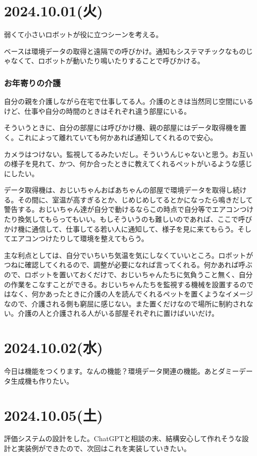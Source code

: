 \documentclass[fleqn,twocolumn]{mynote}
\begin{document}
  \section*{2024.10.01(火)}
  弱くて小さいロボットが役に立つシーンを考える。

  ベースは環境データの取得と遠隔での呼びかけ。通知もシステマチックなものじゃなくて、ロボットが動いたり鳴いたりすることで呼びかける。
  \subsubsection*{お年寄りの介護}
  自分の親を介護しながら在宅で仕事してる人。介護のときは当然同じ空間にいるけど、仕事や自分の時間のときはそれぞれ違う部屋にいる。

  そういうときに、自分の部屋には呼びかけ機、親の部屋にはデータ取得機を置く。これによって離れていても何かあれば通知してくれるので安心。

  カメラはつけない。監視してるみたいだし。そういうんじゃないと思う。お互いの様子を見れて、かつ、何か合ったときに教えてくれるペットがいるような感じにしたい。

  データ取得機は、おじいちゃんおばあちゃんの部屋で環境データを取得し続ける。その間に、室温が高すぎるとか、じめじめしてるとかになったら鳴きだして警告する。おじいちゃん達が自分で動けるならこの時点で自分等でエアコンつけたり換気してもらってもいい。もしそういうのも難しいのであれば、ここで呼びかけ機に通信して、仕事してる若い人に通知して、様子を見に来てもらう。そしてエアコンつけたりして環境を整えてもらう。

  主な利点としては、自分でいちいち気温を気にしなくていいところ。ロボットがつねに確認してくれるので、調整が必要になれば言ってくれる。何かあれば呼ぶので、ロボットを置いておくだけで、おじいちゃんたちに気負うこと無く、自分の作業をこなすことができる。おじいちゃんたちを監視する機械を設置するのではなく、何かあったときに介護の人を読んでくれるペットを置くようなイメージなので、介護される側も窮屈に感じない。また置くだけなので場所に制約されない。介護の人と介護される人がいる部屋それぞれに置けばいいだけ。

  \section*{2024.10.02(水)}
  今日は機能をつくります。なんの機能？環境データ関連の機能。あとダミーデータ生成機も作りたい。

  \section*{2024.10.05(土)}
  評価システムの設計をした。ChatGPTと相談の末、結構安心して作れそうな設計と実装例ができたので、次回はこれを実装していきたい。
\end{document}
